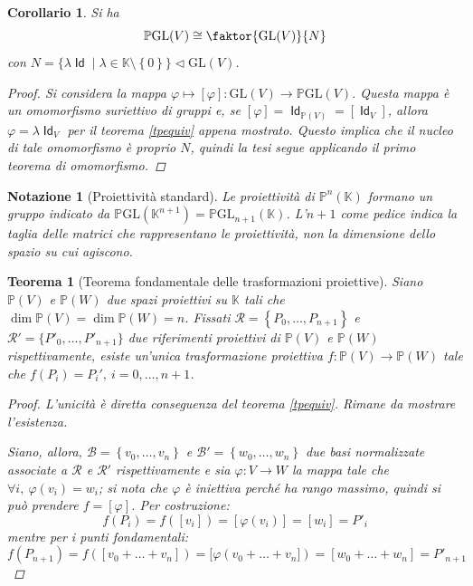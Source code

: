 \documentclass[11pt]{scrartcl}
\theoremstyle{style1}
\newtheorem{teorema}{Teorema}[section]
\newtheorem{corollario}{Corollario}[teorema]
\newtheorem{notazione}{Notazione}[section]
\numberwithin{equation}{subsection}
\renewcommand{\operatorname}[1]{\mathop{\mathrm{\textsf{#1}}}}
\begin{document}
\begin{corollario}
	Si ha
	\[
		\mathbb{P}\mathrm{GL} (V) \cong \faktor{\mathrm{GL} (V)}{N}
	\] 
	con $N = \big\{ \lambda \operatorname{Id}  \mid \lambda \in \mathbb{K}\setminus\left\{ 0 \right\}  \big\}\lhd \mathrm{GL} (V) $.
	\begin{proof}
		Si considera la mappa $\varphi \mapsto [\varphi ] : \mathrm{GL} (V) \to \mathbb{P}\mathrm{GL} (V)$.
		Questa mappa \`e un omomorfismo suriettivo di gruppi e, se $[\varphi ]= \operatorname{Id} _{\mathbb{P}(V)}=[\operatorname{Id}_V] $, allora $\varphi  = \lambda \operatorname{Id} _V$ per il teorema \ref{tpequiv} appena mostrato.
		Questo implica che il nucleo di tale omomorfismo \`e proprio $N$, quindi la tesi segue applicando il primo teorema di omomorfismo.
	\end{proof}
\end{corollario}
\begin{notazione}[Proiettivit\`a standard]
	Le proiettivit\`a di $\mathbb{P}^n(\mathbb{K})$ formano un gruppo indicato da $\mathbb{P}\mathrm{GL} (\mathbb{K}^{n+1} ) = \mathbb{P}\mathrm{GL} _{n+1} (\mathbb{K})$.
	L'$n+1$ come pedice indica la taglia delle matrici che rappresentano le proiettivit\`a, non la dimensione dello spazio su cui agiscono.
\end{notazione}
\begin{teorema}
	[Teorema fondamentale delle trasformazioni proiettive]
	Siano $\mathbb{P}(V)$ e $\mathbb{P}(W)$ due spazi proiettivi su $\mathbb{K}$ tali che $\dim \mathbb{P}(V) = \dim \mathbb{P}(W) = n$.
	Fissati $\mathcal{R} = \left\{P_0,\ldots,P_{n+1}\right\} $ e $\mathcal{R} ' = \{P'_0,\ldots,P'_{n+1} \}$ due riferimenti proiettivi di $\mathbb{P}(V)$ e $\mathbb{P}(W)$ rispettivamente, esiste un'unica trasformazione proiettiva $f:\mathbb{P}(V)\to \mathbb{P}(W)$ tale che $f(P_i) = P_i', \ i=0,\ldots,n+1$. 
	\begin{proof}
		L'unicit\`a \`e diretta conseguenza del teorema \ref{tpequiv}. 
		Rimane da mostrare l'esistenza.

		Siano, allora, $\mathcal{B} = \left\{ v_0,\ldots,v_n \right\} $ e $\mathcal{B}' = \left\{ w_0,\ldots,w_n \right\} $ due basi normalizzate associate a $\mathcal{R} $ e $\mathcal{R} '$ rispettivamente e sia $\varphi  : V \to W$ la mappa tale che $\forall i, \ \varphi (v_i) = w_i$; si nota che $\varphi $ \`e iniettiva perch\'e ha rango massimo, quindi si pu\`o prendere $f = [\varphi ]$.
		Per costruzione:
		\[
			f(P_i) = f([v_i]) = [\varphi (v_i)] = [w_i]=P'_i
		\] 
		mentre per i punti fondamentali:
		\[
			f(P_{n+1} ) = f([v_0+\ldots+v_n]) = [\varphi (v_0+\ldots+v_n]) = [w_0+\ldots+w_n] = P'_{n+1} 
		\] 
	\end{proof}
\end{teorema}
\end{document}
